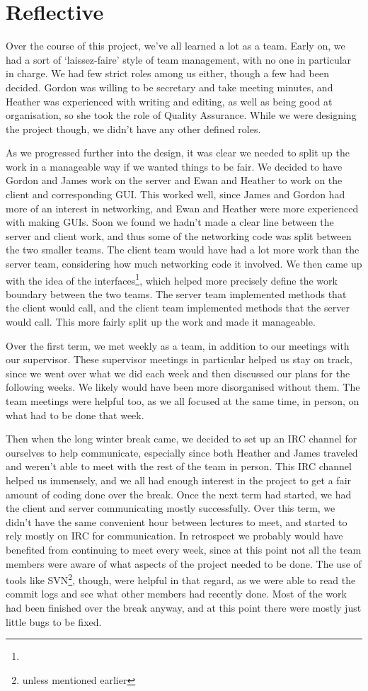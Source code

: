 \section{Reflective}
Over the course of this project, we've all learned a lot as a team. Early on, we had a sort of `laissez-faire' style of team management, with no one in particular in charge. We had few strict roles among us either, though a few had been decided. Gordon was willing to be secretary and take meeting minutes, and Heather was experienced with writing and editing, as well as being good at organisation, so she took the role of Quality Assurance. While we were designing the project though, we didn't have any other defined roles.

As we progressed further into the design, it was clear we needed to split up the work in a manageable way if we wanted things to be fair. We decided to have Gordon and James work on the server and Ewan and Heather to work on the client and corresponding GUI. This worked well, since James and Gordon had more of an interest in networking, and Ewan and Heather were more experienced with making GUIs. Soon we found we hadn't made a clear line between the server and client work, and thus some of the networking code was split between the two smaller teams. The client team would have had a lot more work than the server team, considering how much networking code it involved. We then came up with the idea of the interfaces\footnote{}, which helped more precisely define the work boundary between the two teams. The server team implemented methods that the client would call, and the client team implemented methods that the server would call. This more fairly split up the work and made it manageable.

Over the first term, we met weekly as a team, in addition to our meetings with our supervisor. These supervisor meetings in particular helped us stay on track, since we went over what we did each week and then discussed our plans for the following weeks. We likely would have been more disorganised without them. The team meetings were helpful too, as we all focused at the same time, in person, on what had to be done that week.

Then when the long winter break came, we decided to set up an IRC channel for ourselves to help communicate, especially since both Heather and James traveled and weren't able to meet with the rest of the team in person. This IRC channel helped us immensely, and we all had enough interest in the project to get a fair amount of coding done over the break. Once the next term had started, we had the client and server communicating mostly successfully. Over this term, we didn't have the same convenient hour between lectures to meet, and started to rely mostly on IRC for communication. In retrospect we probably would have benefited from continuing to meet every week, since at this point not all the team members were aware of what aspects of the project needed to be done. The use of tools like SVN\footnote{unless mentioned earlier}, though, were helpful in that regard, as we were able to read the commit logs and see what other members had recently done. Most of the work had been finished over the break anyway, and at this point there were mostly just little bugs to be fixed.

